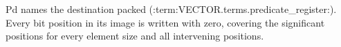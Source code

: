Pd names the destination packed (:term:VECTOR.terms.predicate_register:).  Every bit position in its
image is written with zero, covering the significant positions for every
element size and all intervening positions.
